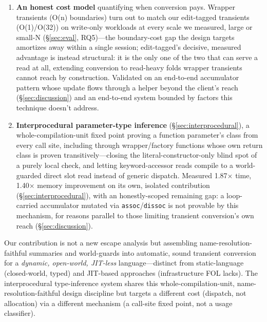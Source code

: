 \documentclass[sigplan,review,anonymous]{acmart}
\begin{document}
\begin{enumerate}
    \item \textbf{An honest cost model} quantifying when conversion pays. Wrapper transients (O(n) boundaries) turn out to match our edit-tagged transients (O(1)/O(32)) on write-only workloads at every scale we measured, large or small-N (§\ref{sec:eval}, RQ5)---the boundary-cost gap the design targets amortizes away within a single session; edit-tagged's decisive, measured advantage is instead structural: it is the only one of the two that can serve a read at all, extending conversion to read-heavy folds wrapper transients cannot reach by construction. Validated on an end-to-end accumulator pattern whose update flows through a helper beyond the client's reach (§\ref{sec:discussion}) and an end-to-end system bounded by factors this technique doesn't address.
    \item \textbf{Interprocedural parameter-type inference} (§\ref{sec:interprocedural}), a whole-compilation-unit fixed point proving a function parameter's class from every call site, including through wrapper/factory functions whose own return class is proven transitively---closing the literal-constructor-only blind spot of a purely local check, and letting keyword-accessor reads compile to a world-guarded direct slot read instead of generic dispatch. Measured 1.87× time, 1.40× memory improvement on its own, isolated contribution (§\ref{sec:interprocedural}), with an honestly-scoped remaining gap: a loop-carried accumulator mutated via \texttt{assoc}/\texttt{dissoc} is not provable by this mechanism, for reasons parallel to those limiting transient conversion's own reach (§\ref{sec:discussion}).
\end{enumerate}

Our contribution is not a new escape analysis but assembling name-resolution-faithful summaries and world-guards into automatic, sound transient conversion for a \emph{dynamic, open-world, JIT-less} language---distinct from static-language (closed-world, typed) and JIT-based approaches (infrastructure FOL lacks). The interprocedural type-inference system shares this whole-compilation-unit, name-resolution-faithful design discipline but targets a different cost (dispatch, not allocation) via a different mechanism (a call-site fixed point, not a usage classifier).
\end{document}
